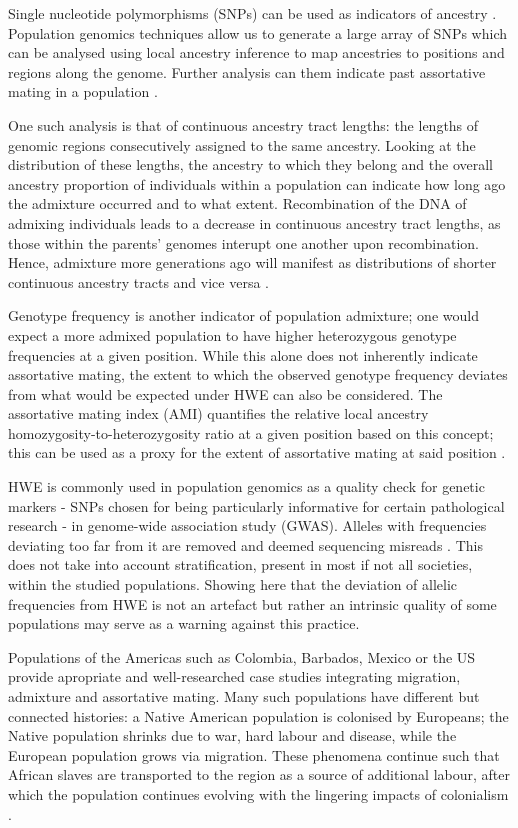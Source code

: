 \documentclass[11pt]{article}
\begin{document}
Single nucleotide polymorphisms (SNPs) can be used as indicators of ancestry \parencite{Risch2009}. Population genomics techniques allow us to generate a large array of SNPs which can be analysed using local ancestry inference to map ancestries to positions and regions along the genome. Further analysis can them indicate past assortative mating in a population \parencite{Schubert2020}.

One such analysis is that of continuous ancestry tract lengths: the lengths of genomic regions consecutively assigned to the same ancestry. Looking at the distribution of these lengths, the ancestry to which they belong and the overall ancestry proportion of individuals within a population can indicate how long ago the admixture occurred and to what extent. Recombination of the DNA of admixing individuals leads to a decrease in continuous ancestry tract lengths, as those within the parents' genomes interupt one another upon recombination. Hence, admixture more generations ago will manifest as distributions of shorter continuous ancestry tracts and vice versa \parencite{Gravel2012}. 

Genotype frequency is another indicator of population admixture; one would expect a more admixed population to have higher heterozygous genotype frequencies at a given position. While this alone does not inherently indicate assortative mating, the extent to which the observed genotype frequency deviates from what would be expected under HWE can also be considered. The assortative mating index (AMI) quantifies the relative local ancestry homozygosity-to-heterozygosity ratio at a given position based on this concept;  this can be used as a proxy for the extent of assortative mating at said position \parencite{Norris2019}.

HWE is commonly used in population genomics as a quality check for genetic markers - SNPs chosen for being particularly informative for certain pathological research - in genome-wide association study (GWAS). Alleles with frequencies deviating too far from it are removed and deemed sequencing misreads \parencite{Linares-Pineda2012}. This does not take into account stratification, present in most if not all societies, within the studied populations. Showing here that the deviation of allelic frequencies from HWE is not an artefact but rather an intrinsic quality of some populations may serve as a warning against this practice.

Populations of the Americas such as Colombia, Barbados, Mexico or the US provide apropriate and well-researched case studies integrating migration, admixture and assortative mating. Many such populations have different but connected histories: a Native American population is colonised by Europeans; the Native population shrinks due to war, hard labour and disease, while the European population grows via migration. These phenomena continue such that African slaves are transported to the region as a source of additional labour, after which the population continues evolving with the lingering impacts of colonialism \parencite{Bryc2010,Mas-Sandoval2019,ESilva2020}. 
\end{document}
